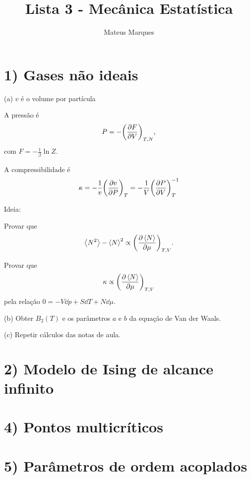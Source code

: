 \documentclass[a4paper,10pt]{article}
\title{\Huge{\textbf{Lista 3 - Mecânica Estatística}}}
\author{Mateus Marques}
\begin{document}
\maketitle

\section*{1) Gases não ideais}

(a) $v$ é o volume por partícula

A pressão é
$$
P = -\qty(\pdv{F}{V})_{T, N},
$$
com $F = -\frac{1}{\beta} \ln Z$.


A compressibilidade é
$$
\kappa = - \frac{1}{v} \qty(\pdv{v}{P})_{T} = - \frac{1}{V} \qty(\pdv{P}{V})_{T}^{-1}
$$

Ideia:

Provar que
$$
\ev{N^2} - \ev{N}^2 \propto \pdvc{\ev{N}}{\mu}{T,V}.
$$

Provar que
$$
\kappa \propto \pdvc{\ev{N}}{\mu}{T,V}
$$
pela relação $0 = - V \dd{p} + S \dd{T} + N \dd{\mu}$.

(b) Obter $B_2(T)$ e os parâmetros $a$ e $b$ da equação de Van der Waals.


(c) Repetir cálculos das notas de aula.


\pagebreak

\section*{2) Modelo de Ising de alcance infinito}



\pagebreak

\section*{4) Pontos multicríticos}



\pagebreak

\section*{5) Parâmetros de ordem acoplados}

%


\end{document}
